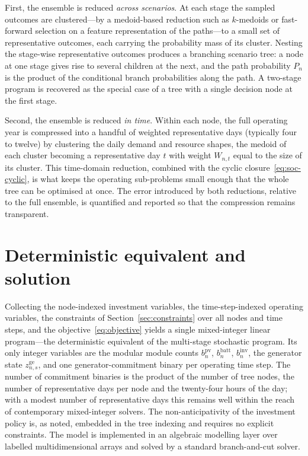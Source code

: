 \documentclass[11pt,a4paper]{article}
\theoremstyle{plain}
\theoremstyle{definition}
\begin{document}
First, the ensemble is reduced \emph{across scenarios}. At each stage the sampled
outcomes are clustered---by a medoid-based reduction such as $k$-medoids or fast-forward
selection on a feature representation of the paths---to a small set of representative
outcomes, each carrying the probability mass of its cluster. Nesting the stage-wise
representative outcomes produces a branching scenario tree: a node at one stage gives
rise to several children at the next, and the path probability $P_n$ is the product of
the conditional branch probabilities along the path. A two-stage program is recovered as
the special case of a tree with a single decision node at the first stage.

Second, the ensemble is reduced \emph{in time}. Within each node, the full operating year
is compressed into a handful of weighted representative days (typically four to twelve) by
clustering the daily demand and resource shapes, the medoid of each cluster becoming a
representative day $t$ with weight $W_{n,t}$ equal to the size of its cluster. This
time-domain reduction, combined with the cyclic closure~\eqref{eq:soc-cyclic}, is what
keeps the operating sub-problems small enough that the whole tree can be optimised at
once. The error introduced by both reductions, relative to the full ensemble, is
quantified and reported so that the compression remains transparent.

\section{Deterministic equivalent and solution}
\label{sec:solution}

Collecting the node-indexed investment variables, the time-step-indexed operating
variables, the constraints of Section~\ref{sec:constraints} over all nodes and time
steps, and the objective~\eqref{eq:objective} yields a single mixed-integer linear
program---the deterministic equivalent of the multi-stage stochastic program. Its only
integer variables are the modular module counts $b^{\mathrm{pv}}_n$,
$b^{\mathrm{batt}}_n$, $b^{\mathrm{inv}}_n$, the generator state
$z^{\mathrm{ge}}_{n,s}$, and one generator-commitment binary per operating time step. The number of commitment binaries is
the product of the number of tree nodes, the number of representative days per node and
the twenty-four hours of the day; with a modest number of representative days this remains
well within the reach of contemporary mixed-integer solvers. The non-anticipativity of the
investment policy is, as noted, embedded in the tree indexing and requires no explicit
constraints. The model is implemented in an algebraic modelling layer over labelled
multidimensional arrays and solved by a standard branch-and-cut solver.
\end{document}

